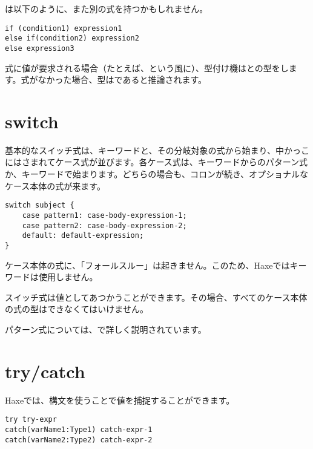 は以下のように、また別の式を持つかもしれません。

\begin{lstlisting}
if (condition1) expression1
else if(condition2) expression2
else expression3
\end{lstlisting}

式に値が要求される場合（たとえば、という風に）、型付け機はとの型をします。式がなかった場合、型はであると推論されます。

\section{switch}
\label{expression-switch}

基本的なスイッチ式は、キーワードと、その分岐対象の式から始まり、中かっこ\expr{\{\}}にはさまれてケース式が並びます。各ケース式は、キーワードからのパターン式か、キーワードで始まります。どちらの場合も、コロンが続き、オプショナルなケース本体の式が来ます。

\begin{lstlisting}
switch subject {
	case pattern1: case-body-expression-1;
	case pattern2: case-body-expression-2;
	default: default-expression;
}
\end{lstlisting}

ケース本体の式に、「フォールスルー」は起きません。このため、Haxeではキーワードは使用しません。

スイッチ式は値としてあつかうことができます。その場合、すべてのケース本体の式の型はできなくてはいけません。

パターン式については、で詳しく説明されています。

\section{try/catch}
\label{expression-try-catch}

Haxeでは、構文を使うことで値を捕捉することができます。

\begin{lstlisting}
try try-expr
catch(varName1:Type1) catch-expr-1
catch(varName2:Type2) catch-expr-2
\end{lstlisting}

